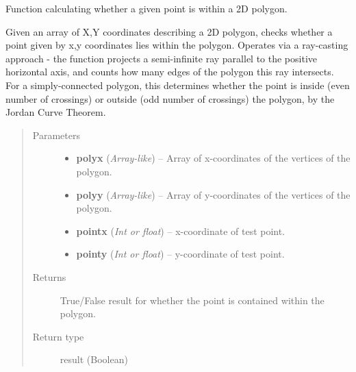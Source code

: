 \documentclass[letterpaper,10pt,english]{sphinxmanual}
\begin{document}
\begin{fulllineitems}
\label{eqtools:eqtools.core.inPolygon}
Function calculating whether a given point is within a 2D polygon.

Given an array of X,Y coordinates describing a 2D polygon, checks whether a
point given by x,y coordinates lies within the polygon. Operates via a
ray-casting approach - the function projects a semi-infinite ray parallel to
the positive horizontal axis, and counts how many edges of the polygon this
ray intersects. For a simply-connected polygon, this determines whether the
point is inside (even number of crossings) or outside (odd number of
crossings) the polygon, by the Jordan Curve Theorem.
\begin{quote}\begin{description}
\item[{Parameters}] \leavevmode\begin{itemize}
\item {} 
\textbf{polyx} (\emph{Array-like}) -- Array of x-coordinates of the vertices of the polygon.

\item {} 
\textbf{polyy} (\emph{Array-like}) -- Array of y-coordinates of the vertices of the polygon.

\item {} 
\textbf{pointx} (\emph{Int or float}) -- x-coordinate of test point.

\item {} 
\textbf{pointy} (\emph{Int or float}) -- y-coordinate of test point.

\end{itemize}

\item[{Returns}] \leavevmode
True/False result for whether the point is contained within the polygon.

\item[{Return type}] \leavevmode
result (Boolean)

\end{description}\end{quote}

\end{fulllineitems}

\end{document}

